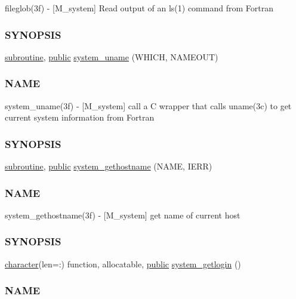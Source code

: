 \begin{DoxyCompactItemize}
\begin{DoxyCompactList}
fileglob(3f) -\/ \mbox{[}M\+\_\+system\mbox{]} Read output of an ls(1) command from Fortran \subsubsection*{S\+Y\+N\+O\+P\+S\+IS}\end{DoxyCompactList}\item 
\hyperlink{M__stopwatch_83_8txt_acfbcff50169d691ff02d4a123ed70482}{subroutine}, \hyperlink{M__stopwatch_83_8txt_a2f74811300c361e53b430611a7d1769f}{public} \hyperlink{namespacem__system_a04e5d49509c44bcb2ccabfd80ec8cdfb}{system\+\_\+uname} (W\+H\+I\+CH, N\+A\+M\+E\+O\+UT)
\begin{DoxyCompactList}\small\item\em \subsubsection*{N\+A\+ME}

system\+\_\+uname(3f) -\/ \mbox{[}M\+\_\+system\mbox{]} call a C wrapper that calls uname(3c) to get current system information from Fortran \subsubsection*{S\+Y\+N\+O\+P\+S\+IS}\end{DoxyCompactList}\item 
\hyperlink{M__stopwatch_83_8txt_acfbcff50169d691ff02d4a123ed70482}{subroutine}, \hyperlink{M__stopwatch_83_8txt_a2f74811300c361e53b430611a7d1769f}{public} \hyperlink{namespacem__system_a96fab225737afb77ff1cbba9866f0d05}{system\+\_\+gethostname} (N\+A\+ME, I\+E\+RR)
\begin{DoxyCompactList}\small\item\em \subsubsection*{N\+A\+ME}

system\+\_\+gethostname(3f) -\/ \mbox{[}M\+\_\+system\mbox{]} get name of current host \subsubsection*{S\+Y\+N\+O\+P\+S\+IS}\end{DoxyCompactList}\item 
\hyperlink{option__stopwatch_83_8txt_abd4b21fbbd175834027b5224bfe97e66}{character}(len=\+:) function, allocatable, \hyperlink{M__stopwatch_83_8txt_a2f74811300c361e53b430611a7d1769f}{public} \hyperlink{namespacem__system_a70f78645a1f130734005e190d469529d}{system\+\_\+getlogin} ()
\begin{DoxyCompactList}\small\item\em \subsubsection*{N\+A\+ME}


\end{DoxyCompactList}
\end{DoxyCompactItemize}
